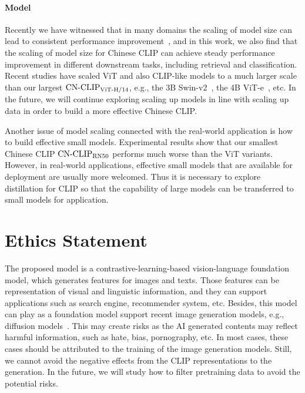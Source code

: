\documentclass[11pt]{article}
\begin{document}
\paragraph{Model} 
Recently we have witnessed that in many domains the scaling of model size can lead to consistent performance improvement~\citep{scaling_laws,emergent}, and in this work, we also find that the scaling of model size for Chinese CLIP can achieve steady performance improvement in different downstream tasks, including retrieval and classification. 
Recent studies have scaled ViT and also CLIP-like models to a much larger scale than our largest $\text{CN-CLIP}\rm_{ViT\text{-}H/14}$, e.g., the 3B Swin-v2~\citep{swin-v2}, the 4B ViT-e~\citep{pali}, etc. 
In the future, we will continue exploring scaling up models in line with scaling up data in order to build a more effective Chinese CLIP. 

Another issue of model scaling connected with the real-world application is how to build effective small models. 
Experimental results show that our smallest Chinese CLIP $\text{CN-CLIP}\rm_{RN50}$ performs much worse than the ViT variants. 
However, in real-world applications, effective small models that are available for deployment are usually more welcomed. 
Thus it is necessary to explore distillation for CLIP so that the capability of large models can be transferred to small models for application. 






\section*{Ethics Statement}
The proposed model is a contrastive-learning-based vision-language foundation model, which generates features for images and texts. Those features can be representation of visual and linguistic information, and they can support applications such as search engine, recommender system, etc. 
Besides, this model can play as a foundation model support recent image generation models, e.g., diffusion models~\citep{dalle2}. 
This may create risks as the AI generated contents may reflect harmful information, such as hate, bias, pornography, etc. 
In most cases, these cases should be attributed to the training of the image generation models. 
Still, we cannot avoid the negative effects from the CLIP representations to the generation. 
In the future, we will study how to filter pretraining data to avoid the potential risks. 
\end{document}
